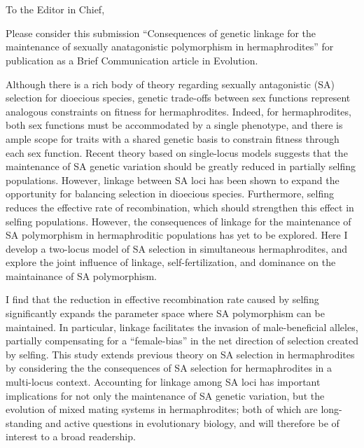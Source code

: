 \documentclass[11pt]{article}
\begin{document}




\section*{}
\noindent To the Editor in Chief,
\bigskip

Please consider this submission “Consequences of genetic linkage for the maintenance of sexually anatagonistic polymorphism in hermaphrodites” for publication as a Brief Communication article in Evolution.
\bigskip

Although there is a rich body of theory regarding sexually antagonistic (SA) selection for dioecious species, genetic trade-offs between sex functions represent analogous constraints on fitness for hermaphrodites. Indeed, for hermaphrodites, both sex functions must be accommodated by a single phenotype, and there is ample scope for traits with a shared genetic basis to constrain fitness through each sex function. Recent theory based on single-locus models suggests that the maintenance of SA genetic variation should be greatly reduced in partially selfing populations. However, linkage between SA loci has been shown to expand the opportunity for balancing selection in dioecious species. Furthermore, selfing reduces the effective rate of recombination, which should strengthen this effect in selfing populations. However, the consequences of linkage for the maintenance of SA polymorphism in hermaphroditic populations has yet to be explored. Here I develop a two-locus model of SA selection in simultaneous hermaphrodites, and explore the joint influence of linkage, self-fertilization, and dominance on the maintainance of SA polymorphism. 
\bigskip

I find that the reduction in effective recombination rate caused by selfing significantly expands the parameter space where SA polymorphism can be maintained. In particular, linkage facilitates the invasion of male-beneficial alleles, partially compensating for a ``female-bias'' in the net direction of selection created by selfing. This study extends previous theory on SA selection in hermaphrodites by considering the the consequences of SA selection for hermaphrodites in a multi-locus context. Accounting for linkage among SA loci has important implications for not only the maintenance of SA genetic variation, but the evolution of mixed mating systems in hermaphrodites; both of which are long-standing and active questions in evolutionary biology, and will therefore be of interest to a broad readership.
\bigskip
\end{document}
